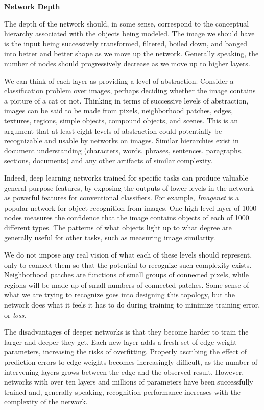 \documentclass[10pt]{article}
\begin{document}
\begin{enumerate}
\textbf{Network Depth}

The depth of the network should, in some sense, correspond to the conceptual hierarchy associated with the objects being modeled. The image we should have is the input being successively transformed, filtered, boiled down, and banged into better and better shape as we move up the network. Generally speaking, the number of nodes should progressively decrease as we move up to higher layers.

We can think of each layer as providing a level of abstraction. Consider a classification problem over images, perhaps deciding whether the image contains a picture of a cat or not. Thinking in terms of successive levels of abstraction, images can be said to be made from pixels, neighborhood patches, edges, textures, regions, simple objects, compound objects, and scenes. This is an argument that at least eight levels of abstraction could potentially be recognizable and usable by networks on images. Similar hierarchies exist in document understanding (characters, words, phrases, sentences, paragraphs, sections, documents) and any other artifacts of similar complexity.

Indeed, deep learning networks trained for specific tasks can produce valuable general-purpose features, by exposing the outputs of lower levels in the network as powerful features for conventional classifiers. For example, \textit{Imagenet} is a popular network for object recognition from images. One high-level layer of 1000 nodes measures the confidence that the image contains objects of each of 1000 different types. The patterns of what objects light up to what degree are generally useful for other tasks, such as measuring image similarity.

We do not impose any real vision of what each of these levels should represent, only to connect them so that the potential to recognize such complexity exists. Neighborhood patches are functions of small groups of connected pixels, while regions will be made up of small numbers of connected patches. Some sense of what we are trying to recognize goes into designing this topology, but the network does what it feels it has to do during training to minimize training error, or \textit{loss}.

The disadvantages of deeper networks is that they become harder to train the larger and deeper they get. Each new layer adds a fresh set of edge-weight parameters, increasing the risks of overfitting. Properly ascribing the effect of prediction errors to edge-weights becomes increasingly difficult, as the number of intervening layers grows between the edge and the observed result. However, networks with over ten layers and millions of parameters have been successfully trained and, generally speaking, recognition performance increases with the complexity of the network.


\end{enumerate}
\end{document}
